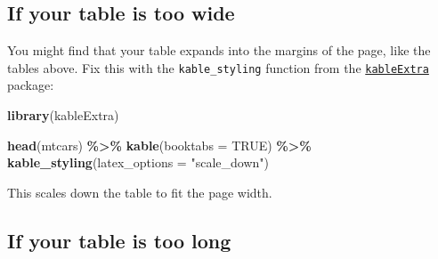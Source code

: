 \documentclass[a4paper, twoside]{templates/ociamthesis}
\newenvironment{Shaded}{\begin{snugshade}}{\end{snugshade}}
\newcommand{\DataTypeTok}[1]{\textcolor[rgb]{0.13,0.29,0.53}{#1}}
\newcommand{\KeywordTok}[1]{\textcolor[rgb]{0.13,0.29,0.53}{\textbf{#1}}}
\newcommand{\NormalTok}[1]{#1}
\newcommand{\OperatorTok}[1]{\textcolor[rgb]{0.81,0.36,0.00}{\textbf{#1}}}
\newcommand{\OtherTok}[1]{\textcolor[rgb]{0.56,0.35,0.01}{#1}}
\newcommand{\StringTok}[1]{\textcolor[rgb]{0.31,0.60,0.02}{#1}}
\renewenvironment{Shaded}
{
  \vspace{10pt}%
  \begin{snugshade}%
}{%
  \end{snugshade}%
  \vspace{8pt}%
}
\theoremstyle{definition}
\theoremstyle{definition}
\theoremstyle{definition}
\theoremstyle{definition}
\theoremstyle{remark}
\begin{document}
\hypertarget{if-your-table-is-too-wide}{%
\subsection{If your table is too wide}\label{if-your-table-is-too-wide}}

You might find that your table expands into the margins of the page, like the tables above.
Fix this with the \texttt{kable\_styling} function from the \href{https://haozhu233.github.io/kableExtra/}{\texttt{kableExtra}} package:

\begin{Shaded}
\begin{Highlighting}[]
\KeywordTok{library}\NormalTok{(kableExtra)}

\KeywordTok{head}\NormalTok{(mtcars) }\OperatorTok{\%\textgreater{}\%}\StringTok{ }
\StringTok{  }\KeywordTok{kable}\NormalTok{(}\DataTypeTok{booktabs =} \OtherTok{TRUE}\NormalTok{) }\OperatorTok{\%\textgreater{}\%}\StringTok{ }
\StringTok{  }\KeywordTok{kable\_styling}\NormalTok{(}\DataTypeTok{latex\_options =} \StringTok{"scale\_down"}\NormalTok{)}
\end{Highlighting}
\end{Shaded}

\begin{table}[H]
\centering
{}
\end{table}

This scales down the table to fit the page width.

\hypertarget{if-your-table-is-too-long}{%
\subsection{If your table is too long}\label{if-your-table-is-too-long}}
\end{document}
